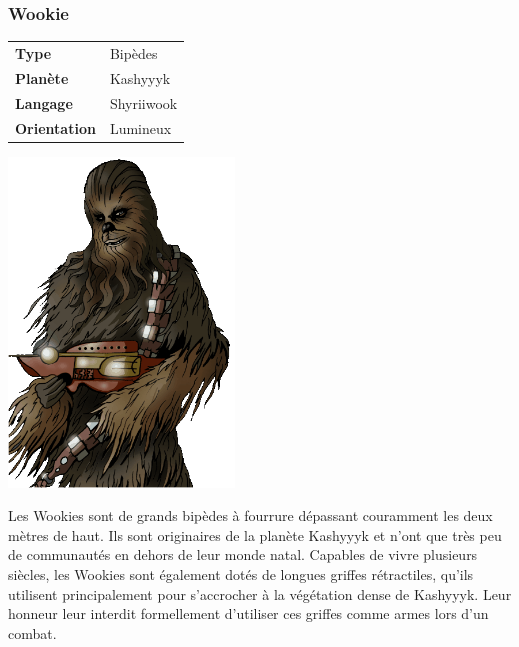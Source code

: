 \subsubsection{Wookie}
\begin{samepage}
	\begin{flushright}
		\begin{tabular}{ l l }
			\textbf{Type} 			& Bipèdes \\
		   	\textbf{Planète} 		& Kashyyyk \\
		   	\textbf{Langage} 		& Shyriiwook \\
		   	\textbf{Orientation} 	& Lumineux \\
		\end{tabular}
	\end{flushright}
	\vspace{-6\baselineskip}
	\includegraphics[width=6cm]{img/personnages/races/wookie.png}
\end{samepage}

Les Wookies sont de grands bipèdes à fourrure dépassant couramment les deux mètres de haut. Ils sont originaires de la planète Kashyyyk et n’ont que très peu de communautés en dehors de leur monde natal. Capables de vivre plusieurs siècles, les Wookies sont également dotés de longues griffes rétractiles, qu’ils utilisent principalement pour s’accrocher à la végétation dense de Kashyyyk. Leur honneur leur interdit formellement d’utiliser ces griffes comme armes lors d’un combat.

